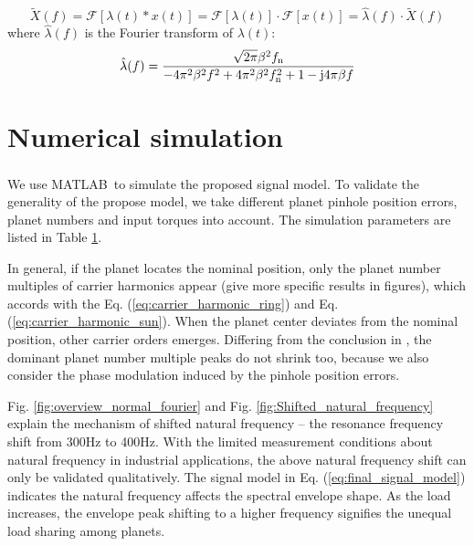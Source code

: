 \documentclass[a4paper,fleqn]{cas-sc}%
\begin{document}
\begin{equation}
        \widetilde{X}(f)= \mathcal{F}\left[\lambda(t) \ast x(t) \right]
                    = \mathcal{F}\left[\lambda(t)\right] \cdot \mathcal{F}\left[x(t)\right]
                    = \hat{\lambda}(f) \cdot \widetilde{X}(f)
\end{equation}
where $\hat{\lambda}(f)$ is the Fourier transform of $\lambda(t)$:
\begin{equation}
    \hat{\lambda}(f)=\frac{\sqrt{2 \pi } \beta ^2 f_{\rm n}}{-4 \pi ^2 \beta ^2 f^2  + 4 \pi ^2 \beta ^2 f_{\rm n}^2+1 - {\rm j} 4 \pi  \beta  f}
\end{equation}
\section{Numerical simulation}
\par We use MATLAB\textsuperscript \textregistered \ to simulate the proposed signal model. To validate the generality of the propose model, we take different planet pinhole position errors, planet numbers and input torques into account. The simulation parameters are listed in Table \ref{}.
\par In general, if the planet locates the nominal position, only the planet number multiples of carrier harmonics appear (give more specific results in figures), which accords with the Eq. (\ref{eq:carrier_harmonic_ring}) and Eq. (\ref{eq:carrier_harmonic_sun}). When the planet center deviates from the nominal position, other carrier orders emerges. Differing from the conclusion in \cite{Mark2009}, the dominant planet number multiple peaks do not shrink too, because we also consider the phase modulation induced by the pinhole position errors. 
\par Fig. \ref{fig:overview_normal_fourier} and Fig. \ref{fig:Shifted_natural_frequency} explain the mechanism of shifted natural frequency -- the resonance frequency shift from 300Hz to 400Hz. With the limited measurement conditions about natural frequency in industrial applications, the above natural frequency shift can only be validated qualitatively. The signal model in Eq. (\ref{eq:final_signal_model}) indicates the natural frequency affects the spectral envelope shape. As the load increases, the envelope peak shifting to a higher frequency signifies the unequal load sharing among planets. 
\end{document}
